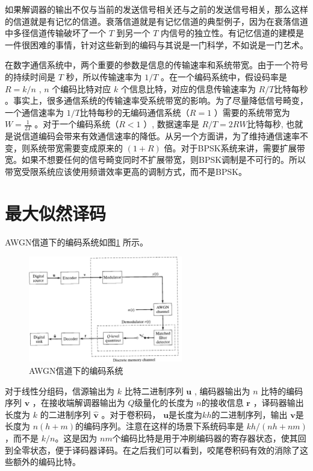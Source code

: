 \documentclass[10pt,a4paper,UTF8]{article}
\begin{document}
如果解调器的输出不仅与当前的发送信号相关还与之前的发送信号相关，那么这样的信道就是有记忆的信道。衰落信道就是有记忆信道的典型例子，因为在衰落信道中多径信道传输破坏了一个 \(T\) 到另一个 \(T\) 内信号的独立性。有记忆信道的建模是一件很困难的事情，针对这些新到的编码与其说是一门科学，不如说是一门艺术。

在数字通信系统中，两个重要的参数是信息的传输速率和系统带宽。由于一个符号的持续时间是 \(T\) 秒，所以传输速率为 \(1/T\) 。在一个编码系统中，假设码率是 \(R=k/n\) , \(n\) 个编码比特对应 \(k\) 个信息比特，对应的信息传输速率为 \(R/T\)比特每秒 。事实上，很多通信系统的传输速率受系统带宽的影响。为了尽量降低信号畸变，一个通信速率为 \(1/T\)比特每秒的无编码通信系统（\(R=1\) ）需要的系统带宽为 \(W = \frac{1}{2T}\) 。对于一个编码系统（\(R<1\) ）, 数据速率是 \(R/T = 2RW\)比特每秒, 也就是说信道编码会带来有效通信速率的降低。从另一个方面讲，为了维持通信速率不变，则系统带宽需要变成原来的 \((1+R)\) 倍。对于BPSK系统来讲，需要扩展带宽。如果不想要任何的信号畸变同时不扩展带宽，则BPSK调制是不可行的。所以带宽受限系统应该使用频谱效率更高的调制方式，而不是BPSK。

\section{最大似然译码}
\label{sec:orgheadline4}


AWGN信道下的编码系统如图\ref{fig:orgparagraph6} 所示。

\begin{figure}[htb]
\centering
\includegraphics[width=0.6\textwidth]{../../img/20161114fig01_07.png}
\caption{\label{fig:orgparagraph6}
AWGN信道下的编码系统}
\end{figure}

对于线性分组码，信源输出为 \(k\) 比特二进制序列 \(\mathbf{u}\) , 编码器输出为 \(n\) 比特的编码序列 \(\mathbf{v}\) ，在接收端解调器输出为 \(Q\)级量化的长度为 \(n\)的接收信息 \(\mathbf{r}\) ，译码器输出长度为 \(k\) 的二进制序列 \(\hat{\mathbf{v}}\) 。对于卷积码， \(\mathbf{u}\)是长度为\(kh\)的二进制序列，输出 \(\mathbf{v}\)是长度为 \(n(h+m)\)的编码序列。注意在这样的场景下系统码率是 \(kh/(nh + nm)\)，而不是 \(k/n\)。这是因为 \(nm\)个编码比特是用于冲刷编码器的寄存器状态，使其回到全零状态，便于译码器译码。在之后我们可以看到，咬尾卷积码有效的消除了这些额外的编码比特。
\end{document}
